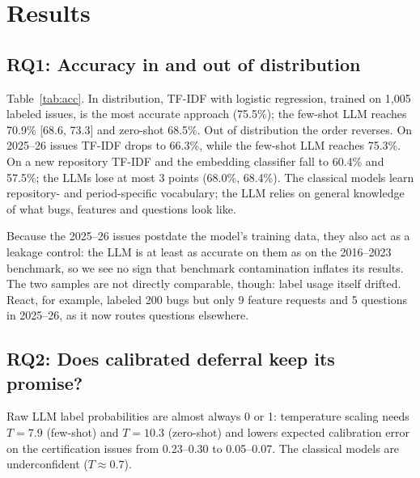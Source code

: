 \section{Results}\label{sec:results}

\begin{table}[t]
\caption{Accuracy (\%) by condition and cross-repository F1. Tokens: LLM prompt tokens per issue.}\label{tab:acc}
\small

\end{table}

\subsection{RQ1: Accuracy in and out of distribution}
Table~\ref{tab:acc}. In distribution, TF-IDF with logistic regression, trained on 1{,}005 labeled
issues, is the most accurate approach (75.5\%); the few-shot LLM reaches 70.9\% [68.6, 73.3] and
zero-shot 68.5\%. Out of distribution the order reverses. On 2025--26 issues TF-IDF drops to 66.3\%,
while the few-shot LLM reaches 75.3\%. On a new repository TF-IDF and the embedding classifier fall to
60.4\% and 57.5\%; the LLMs lose at most 3 points (68.0\%, 68.4\%). The classical models learn
repository- and period-specific vocabulary; the LLM relies on general knowledge of what bugs, features
and questions look like.

Because the 2025--26 issues postdate the model's training data, they also act as a leakage control:
the LLM is at least as accurate on them as on the 2016--2023 benchmark, so we see no sign that
benchmark contamination inflates its results. The two samples are not directly comparable, though:
label usage itself drifted. React, for example, labeled 200 bugs but only 9 feature requests and 5
questions in 2025--26, as it now routes questions elsewhere.

\begin{table}[t]
\caption{Selective automation: coverage / risk (\%), i.e., share auto-labeled / errors among them;
for the risk-controlled policy also (errors/auto-labeled). Target risk: 10\%. ``Reused'': the
in-distribution calibration applied to the new repository; ``LORO'': leave-one-repository-out
calibration. Conformal: auto-label singleton sets.}\label{tab:sel}
\small

\end{table}

\subsection{RQ2: Does calibrated deferral keep its promise?}
Raw LLM label probabilities are almost always 0 or 1: temperature scaling needs $T{=}7.9$ (few-shot)
and $T{=}10.3$ (zero-shot) and lowers expected calibration error on the certification issues from
0.23--0.30 to 0.05--0.07. The classical models are underconfident ($T{\approx}0.7$).

